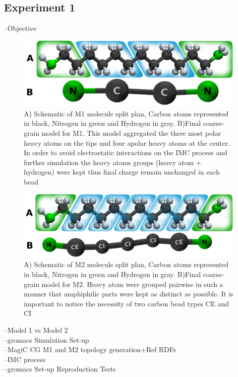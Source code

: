 \documentclass[10pt,a4paper,twoside]{article}
\begin{document}
\subsection{Experiment 1}
 --Objective\\
 \begin{figure}[ht]
	\includegraphics[width=1.0 \textwidth]{./images/M1ab}
	\caption{A) Schematic of M1 molecule split plan, Carbon atoms represented in black, Nitrogen in green and Hydrogen in gray. B)Final coarse-grain model for M1. This model aggregated the three most polar heavy atoms on the tips and four apolar heavy atoms at the center. In order to avoid electrostatic interactions on the IMC process and further simulation the heavy atoms groups (heavy atom + hydrogen) were kept thus  final charge remain unchanged in each bead}
	\label{Fig:mol1}
\end{figure}
 \begin{figure}[ht]
	\includegraphics[width=1.0 \textwidth]{./images/M2ab}
	\caption{A) Schematic of M2 molecule split plan, Carbon atoms represented in black, Nitrogen in green and Hydrogen in gray. B)Final coarse-grain model for M2. Heavy atom were grouped pairwise in such a manner that amphiphilic parts were kept as distinct as possible. It is important to notice the necessity of two carbon bead types CE and CI}
		\label{Fig:mol2}
\end{figure}
 
 --Model 1 vs Model 2 \\
 --gromacs Simulation Set-up\\
 --MagiC CG M1 and M2 topology generation+Ref RDFs\\
 --IMC process\\
 --gromacs Set-up Reproduction Tests
\end{document}
